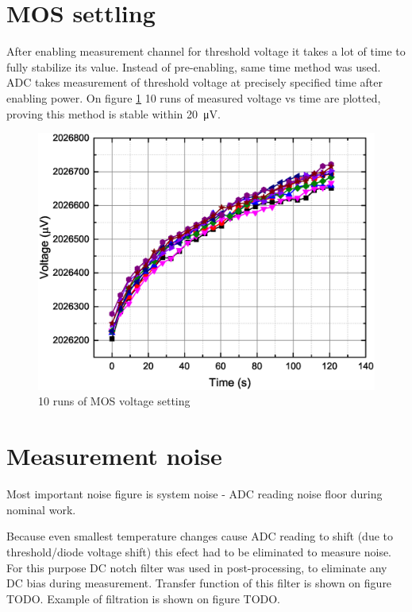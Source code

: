 \section{MOS settling}
    After enabling measurement channel for threshold voltage it takes a lot of time to fully stabilize its value. Instead of pre-enabling, same time method was used. ADC takes measurement of threshold voltage at precisely specified time after enabling power. On figure \ref{MOS_settling} 10 runs of measured voltage vs time are plotted, proving this method is stable within \SI{20}{\uV}.

    \begin{figure}[H]
        \centering
        \includegraphics[width=0.8\paperwidth]{img/07/MOS_settling.eps}
        \caption{10 runs of MOS voltage setting}
        \label{MOS_settling}
    \end{figure}

\section{Measurement noise}
    Most important noise figure is system noise - ADC reading noise floor during nominal work.

    Because even smallest temperature changes cause ADC reading to shift (due to threshold/diode voltage shift) this efect had to be eliminated to measure noise. For this purpose DC notch filter was used in post-processing, to eliminate any DC bias during measurement. Transfer function of this filter is shown on figure TODO. Example of filtration is shown on figure TODO.

